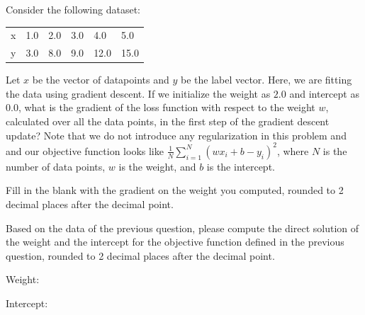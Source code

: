 \documentclass[11pt,addpoints,answers]{exam}
\numberwithin{equation}{section} %
\numberwithin{figure}{section} %
\numberwithin{table}{section} %
\begin{document}
\begin{questions}
    
    
    \newpage
    
    \question[2] \label{Q7_linear_regression} Consider the following dataset:
    \begin{table}[H]
    \centering
        \begin{tabular}{llllll}
        x & 1.0 & 2.0 & 3.0 & 4.0 & 5.0 \\
        y & 3.0 & 8.0 & 9.0 & 12.0 & 15.0
        \end{tabular}
    \end{table}
    Let $x$ be the vector of datapoints and $y$ be the label vector. Here, we are fitting the data using gradient descent. If we initialize the weight as $2.0$ and intercept as $0.0$, what is the gradient of the loss function with respect to the weight $w$, calculated over all the data points, in the first step of the gradient descent update? Note that we do not introduce any regularization in this problem and and our objective function looks like $\frac{1}{N}\sum_{i=1}^N (wx_i + b - y_i)^2$, where $N$ is the number of data points, $w$ is the weight, and $b$ is the intercept.
    
    Fill in the blank with the gradient on the weight you computed, rounded to 2 decimal places after the decimal point.
    
    \begin{tcolorbox}[fit,height=1cm, width=4cm, blank, borderline={1pt}{-2pt},nobeforeafter, top=2pt, left=2pt, right=2pt, bottom=2pt]
    \end{tcolorbox}
    
    
    
    \question[4] Based on the data of the previous question, please compute the direct solution of the weight and the intercept for the objective function defined in the previous question, rounded to 2 decimal places after the decimal point.
    
    Weight: \quad
    \begin{tcolorbox}[fit,height=1cm, width=4cm, blank, borderline={1pt}{-2pt},nobeforeafter, top=2pt, left=2pt, right=2pt, bottom=2pt]
    \end{tcolorbox}
    
    
    Intercept: \quad
    \begin{tcolorbox}[fit,height=1cm, width=4cm, blank, borderline={1pt}{-2pt},nobeforeafter, top=2pt, left=2pt, right=2pt, bottom=2pt]
    \end{tcolorbox}
    
    
    

\end{questions}
\end{document}
